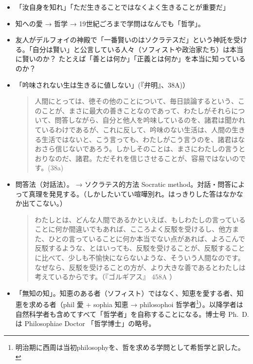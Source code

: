 \documentclass[uplatex,dvipdfmx]{jsarticle} \usepackage{mystyle}%
\begin{document}
\begin{itemize}
\item 「汝自身を知れ」「ただ生きることではなくよく生きることが重要だ」
\item 知への愛 → 哲学 → 19世紀ごろまで学問はなんでも「哲学」。
\item 友人がデルフォイの神殿で「一番賢いのはソクラテスだ」という神託を受ける。「自分は賢い」と公言している人々（ソフィストや政治家たち）は本当に賢いのか？
たとえば「善とは何か」「正義とは何か」を本当に知っているのか？



\item 「吟味されない生は生きるに値しない」(『弁明』、38A)）



  \begin{quote}
    人間にとっては、徳その他のことについて、毎日談論するという、このことが、まさに最大の善きことなのであって、わたしがそれらについて、問答しながら、自分と他人を吟味しているのを、諸君は聞かれているわけであるが、これに反して、吟味のない生活は、人間の生きる生活ではないと、こう言っても、わたしがこう言うのを、諸君はなおさら信じないであろう。しかしそのことは、まさにわたしの言うとおりなのだ、諸君。ただそれを信じさせることが、容易ではないのです。(38a)
  \end{quote}

\item 問答法（対話法）。 → ソクラテス的方法 Socratic method。対話・問答によって真理を発見する。（しかしたいてい喧嘩別れ。はっきりした答はなかなか出てこない。）

  \begin{quote}
     わたしとは、どんな人間であるかといえば、もしわたしの言っていることに何か間違いでもあれば、こころよく反駁を受けるし、他方また、ひとの言っていることに何か本当でない点があれば、よろこんで反駁するような、とはいっても、反駁を受けることが、反駁することに比べて、少しも不愉快にならないような、そういう人間なのです。なぜなら、反駁を受けることの方が、より大きな善であるとわたしは考えているからです。（『ゴルギアス』 458A ）
  \end{quote}


\item 「無知の知」。知恵のある者（ソフィスト）ではなく、知恵を愛する者、知恵を求める者（phil 愛 + sophia 知恵 → philosophoi 哲学者\footnote{明治期に西周は当初philosophyを、哲を求める学問として希哲学と訳した。}）。以降学者は自然科学者も含めてすべて「哲学者」を自称することになる。博士号 Ph.~D.は Philosophiae Doctor 「哲学博士」の略号。


\end{itemize}
\end{document}
